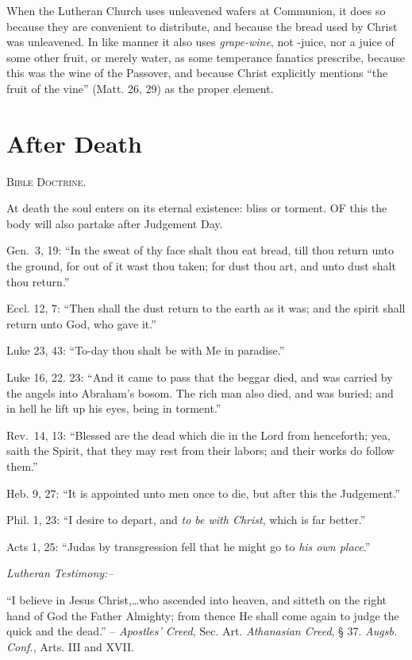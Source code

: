 \documentclass[
]{book}
\begin{document}
When the Lutheran Church uses unleavened wafers at Communion, it does so because they are convenient to distribute, and because the bread used by Christ was unleavened. In like manner it also uses \emph{grape-wine}, not -juice, nor a juice of some other fruit, or merely water, as some temperance fanatics prescribe, because this was the wine of the Passover, and because Christ explicitly mentions ``the fruit of the vine'' (Matt. 26, 29) as the proper element.

\section{After Death}\label{after-death}

\begin{center}
\textsc{Bible Doctrine.}
\end{center}

At death the soul enters on its eternal existence: bliss or torment. OF this the body will also partake after Judgement Day.

Gen.~3, 19: ``In the sweat of thy face shalt thou eat bread, till thou return unto the ground, for out of it wast thou taken; for dust thou art, and unto dust shalt thou return.''

Eccl. 12, 7: ``Then shall the dust return to the earth as it was; and the spirit shall return unto God, who gave it.''

Luke 23, 43: ``To-day thou shalt be with Me in paradise.''

Luke 16, 22. 23: ``And it came to pass that the beggar died, and was carried by the angels into Abraham's bosom. The rich man also died, and was buried; and in hell he lift up his eyes, being in torment.''

Rev.~14, 13: ``Blessed are the dead which die in the Lord from henceforth; yea, saith the Spirit, that they may rest from their labors; and their works do follow them.''

Heb. 9, 27: ``It is appointed unto men once to die, but after this the Judgement.''

Phil. 1, 23: ``I desire to depart, and \emph{to be with Christ}, which is far better.''

Acts 1, 25: ``Judas by transgression fell that he might go to \emph{his own place}.''

\begin{center}
\textsl{Lutheran Testimony:--}
\end{center}

``I believe in Jesus Christ,\ldots who ascended into heaven, and sitteth on the right hand of God the Father Almighty; from thence He shall come again to judge the quick and the dead.'' -- \emph{Apostles' Creed}, Sec. Art. \emph{Athanasian Creed}, § 37. \emph{Augsb. Conf.}, Arts. III and XVII.
\end{document}

